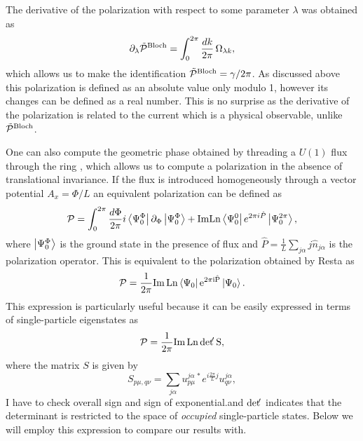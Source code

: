 \documentclass[twocolumn,amsmath,longbibliography,amssymb,superscriptaddress]{revtex4-1}
\newcommand{\carlos}[1]{{\color{red} #1}}
\begin{document}
The derivative of the polarization with respect to some parameter $\lambda$ was obtained \cite{KingSmith1993} as
\begin{equation}
\partial_\lambda \tilde{\mathcal{P}}^{\rm Bloch} = \int_{0}^{2\pi} \frac{dk}{2\pi} \, \Omega_{\lambda k},
\end{equation}
which allows us to make the identification $ \tilde{\mathcal{P}}^{\rm Bloch} = \gamma/2\pi$. As discussed above this polarization is defined as an absolute value only modulo 1, however its changes can be defined as a real number. This is no surprise as the derivative of the polarization is related to the current which is a physical observable, unlike $\tilde{\mathcal{P}}^{\rm Bloch}$. 

One can also compute the geometric phase obtained by threading a $U(1)$ flux through the ring \cite{Watanabe2018}, which allows us to compute a polarization in the absence of translational invariance. If the flux is introduced homogeneously through a vector potential $A_x = \Phi/L$ an equivalent polarization can be defined as
\begin{equation}
\mathcal{P} = \int_0^{2\pi}\frac{d\Phi}{2\pi} i\bra{\Psi_0^\Phi}\partial_\Phi \ket{\Psi_0^\Phi} + {\rm Im}{\rm Ln} \bra{\Psi_0^0}e^{2\pi i \hat{P}} \ket{\Psi_0^{2\pi}}, 
\end{equation}
where $\ket{\Psi_0^{\Phi}}$ is the ground state in the presence of flux and $\hat{P}=\frac{1}{L}\sum_{j\alpha} j\hat{n}_{j\alpha}$ is the polarization operator. This is equivalent to the polarization obtained by Resta \cite{Resta1997} as
\begin{align}
\mathcal{P} = \frac{1}{2\pi} \rm{ Im }\,{\rm Ln}\bra{\Psi_0}e^{2\pi i \hat{P}}\ket{\Psi_0}.
\end{align}
This expression is particularly useful because it can be easily expressed in terms of single-particle eigenstates as
\begin{align}
\mathcal{P} = \frac{1}{2\pi} \rm{Im \,Ln} \, {\rm det }\!' \, S,
\label{eq:polarization_resta}
\end{align}
where the matrix $S$ is given by
\begin{equation}
S_{p\mu,q\nu} = \sum_{j\alpha} u_{p\mu}^{j \alpha \, \ast} e^{i\frac{2\pi}{L}j}u_{q\nu}^{j \alpha},
\end{equation}
\carlos{I have to check overall sign and sign of exponential.}and  ${\rm det }\!' $ indicates that the determinant is restricted to the space of \emph{occupied} single-particle states. Below we will employ this expression to compare our results with.
\end{document}
